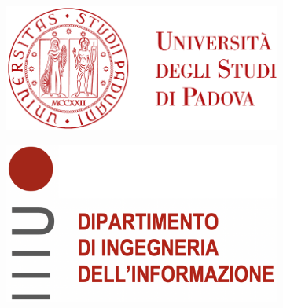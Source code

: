 \begin{titlepage}
        \begin{figure}
            \centering
            \begin{subfigure}[b]{0.4\textwidth}
                \includegraphics[width=\textwidth]{Immagini/logo_unipd}
            \end{subfigure}
            \hfill
            \begin{subfigure}[b]{0.3\textwidth}
                \includegraphics[width=\textwidth]{Immagini/logo_dei.png}
            \end{subfigure}
        \end{figure}
    
    
        \begin{center}
            \makeatletter %

    

\end{center}
\end{titlepage}

